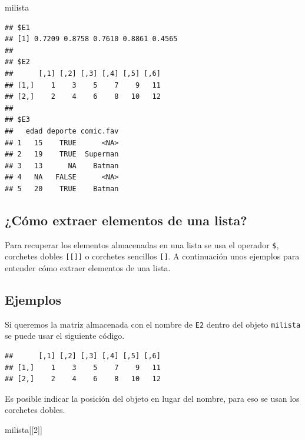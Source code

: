 \documentclass[10pt,]{krantz}
\makeatletter
\newenvironment{Shaded}{\begin{snugshade}}{\end{snugshade}}
\newcommand{\DecValTok}[1]{\textcolor[rgb]{0.00,0.00,0.81}{#1}}
\newcommand{\OperatorTok}[1]{\textcolor[rgb]{0.81,0.36,0.00}{\textbf{#1}}}
\newcommand{\NormalTok}[1]{#1}
\newenvironment{kframe}{%
\medskip{}
\setlength{\fboxsep}{.8em}
 \def\at@end@of@kframe{}%
 \ifinner\ifhmode%
  \def\at@end@of@kframe{\end{minipage}}%
  \begin{minipage}{\columnwidth}%
 \fi\fi%
 \def\FrameCommand##1{\hskip\@totalleftmargin \hskip-\fboxsep
 \colorbox{shadecolor}{##1}\hskip-\fboxsep
     \hskip-\linewidth \hskip-\@totalleftmargin \hskip\columnwidth}%
 \MakeFramed {\advance\hsize-\width
   \@totalleftmargin\z@ \linewidth\hsize
   \@setminipage}}%
 {\par\unskip\endMakeFramed%
 \at@end@of@kframe}
\renewenvironment{Shaded}{\begin{kframe}}{\end{kframe}}
\makeatother
\begin{document}
\begin{Shaded}
\begin{Highlighting}[]
\NormalTok{milista}
\end{Highlighting}
\end{Shaded}

\begin{verbatim}
## $E1
## [1] 0.7209 0.8758 0.7610 0.8861 0.4565
## 
## $E2
##      [,1] [,2] [,3] [,4] [,5] [,6]
## [1,]    1    3    5    7    9   11
## [2,]    2    4    6    8   10   12
## 
## $E3
##   edad deporte comic.fav
## 1   15    TRUE      <NA>
## 2   19    TRUE  Superman
## 3   13      NA    Batman
## 4   NA   FALSE      <NA>
## 5   20    TRUE    Batman
\end{verbatim}

\subsection{¿Cómo extraer elementos de una
lista?}\label{como-extraer-elementos-de-una-lista}

Para recuperar los elementos almacenadas en una lista se usa el operador
\texttt{\$}, corchetes dobles \texttt{{[}{[}{]}{]}} o corchetes
sencillos \texttt{{[}{]}}. A continuación unos ejemplos para entender
cómo extraer elementos de una lista.

\subsection*{Ejemplos}\label{ejemplos-1}


Si queremos la matriz almacenada con el nombre de \texttt{E2} dentro del
objeto \texttt{milista} se puede usar el siguiente código.

\begin{Shaded}
\end{Shaded}

\begin{verbatim}
##      [,1] [,2] [,3] [,4] [,5] [,6]
## [1,]    1    3    5    7    9   11
## [2,]    2    4    6    8   10   12
\end{verbatim}

Es posible indicar la posición del objeto en lugar del nombre, para eso
se usan los corchetes dobles.

\begin{Shaded}
\begin{Highlighting}[]
\NormalTok{milista[[}\DecValTok{2}\NormalTok{]]}
\end{Highlighting}
\end{Shaded}
\end{document}
